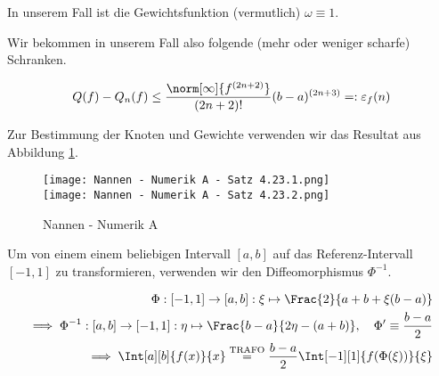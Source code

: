 \begin{solution}

In unserem Fall ist die Gewichtsfunktion (vermutlich) $\omega \equiv 1$.


Wir bekommen in unserem Fall also folgende (mehr oder weniger scharfe) Schranken.

\begin{align*}
  Q(f) - Q_n(f)
  \leq
  \frac
  {
    \norm[\infty]{f^{(2n+2)}}
  }{
    (2n + 2)!
  }
  (b - a)^{(2n+3)}
  =:
  \varepsilon_f(n)
\end{align*}

Zur Bestimmung der Knoten und Gewichte verwenden wir das Resultat aus Abbildung \ref{fig:NNAS4.23}.

\begin{figure}[h!]
  \begin{boxedin}
    \begin{center}
      \texttt{[image: Nannen - Numerik A - Satz 4.23.1.png]} \\
      \vspace{0.5 cm}
      \texttt{[image: Nannen - Numerik A - Satz 4.23.2.png]}
      \caption{Nannen - Numerik A}
      \label{fig:NNAS4.23}
    \end{center}
  \end{boxedin}
\end{figure}

Um von einem einem beliebigen Intervall $[a, b]$ auf das Referenz-Intervall $[-1, 1]$ zu transformieren, verwenden wir den Diffeomorphismus $\Phi^{-1}$.

\begin{align*}
  \Phi:
  [-1, 1] \to [a, b]:
  \xi \mapsto \Frac{2}{a + b + \xi (b - a)} \\
  \implies
  \Phi^{-1}:
  [a, b] \to [-1, 1]:
  \eta \mapsto \Frac{b-a}{2 \eta - (a + b)},
  \quad
  \Phi^\prime \equiv \frac{b - a}{2} \\
  \implies
  \Int[a][b]{f(x)}{x}
  \stackrel{\text{TRAFO}}{=}
  \frac{b - a}{2}
  \Int[-1][1]{f(\Phi(\xi))}{\xi}
\end{align*}

\end{solution}

